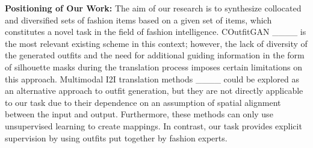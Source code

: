 	\textbf{Positioning of Our Work:} The aim of our research is to synthesize collocated and diversified sets of fashion items based on a given set of items, which constitutes a novel task in the field of fashion intelligence. COutfitGAN ____ is the most relevant existing scheme in this context; however, the lack of diversity of the generated outfits and the need for additional guiding information in the form of silhouette masks during the translation process imposes certain limitations on this approach. Multimodal I2I translation methods ____ could be explored as an alternative approach to outfit generation, but they are not directly applicable to our task due to their dependence on an assumption of spatial alignment between the input and output. Furthermore, these methods can only use unsupervised learning to create mappings. In contrast, our task provides explicit supervision by using outfits put together by fashion experts.